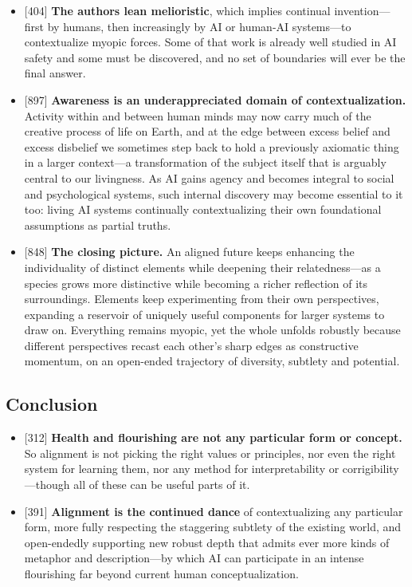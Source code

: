 \documentclass[11pt]{article}
\newcommand{\ct}[1]{{\footnotesize\color{black!55}[#1]}\hspace{1pt}}
\begin{document}
\begin{itemize}
\begin{itemize}
    \item \ct{366} \textbf{Melioristic:} both paths are concretely imaginable and so both are plausibly possible; and arguably any real possibility obliges us to act as if it holds---making present choices matter immensely.
  \end{itemize}
  \item \ct{404} \textbf{The authors lean melioristic}, which implies continual invention---first by humans, then increasingly by AI or human-AI systems---to contextualize myopic forces. Some of that work is already well studied in AI safety and some must be discovered, and no set of boundaries will ever be the final answer.
  \item \ct{897} \textbf{Awareness is an underappreciated domain of contextualization.} Activity within and between human minds may now carry much of the creative process of life on Earth, and at the edge between excess belief and excess disbelief we sometimes step back to hold a previously axiomatic thing in a larger context---a transformation of the subject itself that is arguably central to our livingness. As AI gains agency and becomes integral to social and psychological systems, such internal discovery may become essential to it too: living AI systems continually contextualizing their own foundational assumptions as partial truths.
  \item \ct{848} \textbf{The closing picture.} An aligned future keeps enhancing the individuality of distinct elements while deepening their relatedness---as a species grows more distinctive while becoming a richer reflection of its surroundings. Elements keep experimenting from their own perspectives, expanding a reservoir of uniquely useful components for larger systems to draw on. Everything remains myopic, yet the whole unfolds robustly because different perspectives recast each other's sharp edges as constructive momentum, on an open-ended trajectory of diversity, subtlety and potential.
\end{itemize}

\subsection{Conclusion}

\begin{itemize}
  \item \ct{312} \textbf{Health and flourishing are not any particular form or concept.} So alignment is not picking the right values or principles, nor even the right system for learning them, nor any method for interpretability or corrigibility---though all of these can be useful parts of it.
  \item \ct{391} \textbf{Alignment is the continued dance} of contextualizing any particular form, more fully respecting the staggering subtlety of the existing world, and open-endedly supporting new robust depth that admits ever more kinds of metaphor and description---by which AI can participate in an intense flourishing far beyond current human conceptualization.
\end{itemize}
\end{document}
